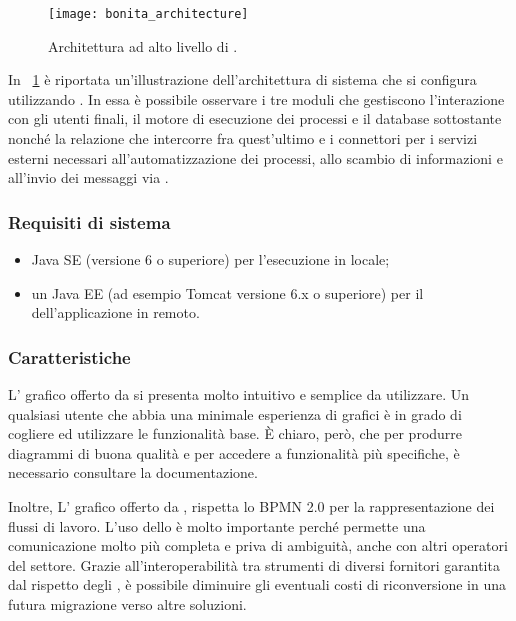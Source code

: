 \begin{figure}[H]
  \centering
  \texttt{[image: bonita\_architecture]}
  \caption{Architettura ad alto livello di \progname.}
  \label{fig:bonitaarchitecture}
\end{figure}

In \figurename~\ref{fig:bonitaarchitecture} è riportata un'illustrazione dell'architettura di sistema che si configura utilizzando \progname. In essa è possibile osservare i tre moduli che gestiscono l'interazione con gli utenti finali, il motore di esecuzione dei processi e il database sottostante nonché la relazione che intercorre fra quest'ultimo e i connettori per i servizi esterni necessari all'automatizzazione dei processi, allo scambio di informazioni e all'invio dei messaggi via .

\subsubsection{Requisiti di sistema}
\begin{itemize}
\item Java SE  (versione 6 o superiore) per l'esecuzione in locale;
\item un  Java EE (ad esempio Tomcat versione 6.x o superiore) per il  dell'applicazione in remoto.
\end{itemize}


\subsubsection{Caratteristiche}

L' grafico offerto da \progname si presenta molto intuitivo e semplice da utilizzare. Un qualsiasi utente che abbia una minimale esperienza di  grafici è in grado di cogliere ed utilizzare le funzionalità base. È  chiaro, però, che per produrre diagrammi di buona qualità e per accedere a funzionalità più specifiche, è necessario consultare la documentazione. 

Inoltre, L' grafico offerto da \progname, rispetta lo  BPMN 2.0 per la rappresentazione dei flussi di lavoro. L'uso dello  è molto importante perché permette una comunicazione molto più completa e priva di ambiguità, anche con altri operatori del settore. Grazie all'interoperabilità tra strumenti di diversi fornitori garantita dal rispetto degli , è possibile diminuire gli eventuali costi di riconversione in una futura migrazione verso altre soluzioni.

